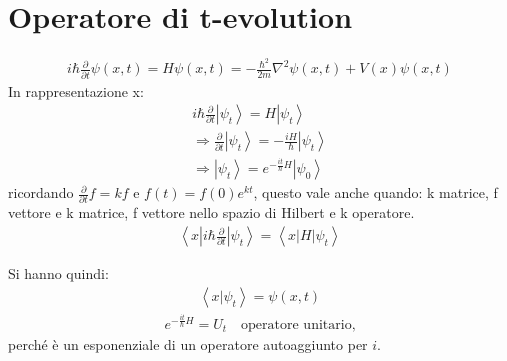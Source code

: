 \section{Operatore di t-evolution} %
\begin{equation}\begin{split}
i\hbar \frac{\partial }{\partial t}\psi \left(x,t\right)=H\psi \left(x,t\right)=-\frac{\hbar ^2}{2m}\nabla ^2\psi \left(x,t\right)+V\left(x\right)\psi \left(x,t\right)
\end{split}\end{equation}
In rappresentazione x:
\begin{equation}\begin{split}
i\hbar\frac{\partial }{\partial t}\left |\psi _t \right\rangle =H\left |\psi _t \right\rangle \\
\Longrightarrow \frac{\partial }{\partial t}\left |\psi _t \right\rangle=-\frac{iH}{\hbar }\left |\psi _t \right\rangle \\
\Longrightarrow \left |\psi _t \right\rangle=e^{-\frac{it}{\hbar }H}\left |\psi _0 \right\rangle
\end{split}\end{equation}
ricordando $\frac{\partial }{\partial t}f=kf$ e $f(t)=f(0)e^{kt}$, questo vale anche quando: k matrice, f vettore e k matrice, f vettore nello spazio di Hilbert e k operatore.
\begin{equation}\begin{split}
\left\langle x|i\hbar \frac{\partial }{\partial t}|\psi _t \right\rangle=\left\langle x|H|\psi _t \right\rangle
\end{split}\end{equation}

Si hanno quindi:
\begin{equation}\begin{split}
\left\langle x|\psi _t \right\rangle=\psi \left(x,t\right)
\end{split}\end{equation}
\begin{equation}\begin{split}
e^{-\frac{it}{\hbar }H}=U_t \quad \textrm{operatore unitario,}
\end{split}\end{equation}
perché è un esponenziale di un operatore autoaggiunto per $i$.

